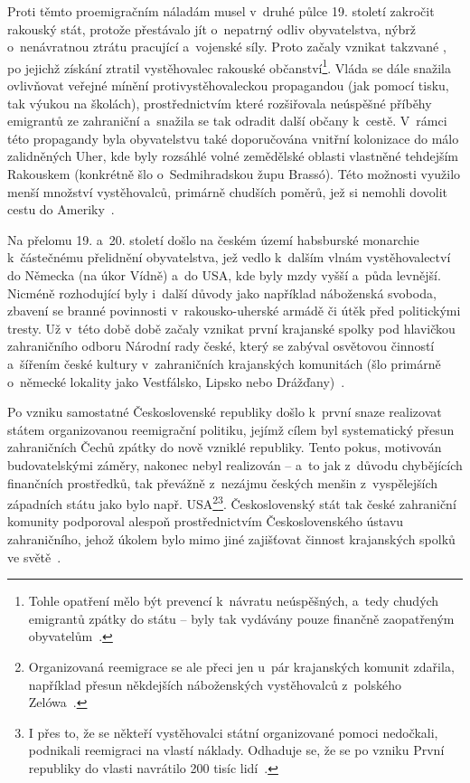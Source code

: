 Proti těmto proemigračním náladám musel v~druhé půlce 19. století zakročit rakouský stát, protože přestávalo jít o~nepatrný odliv obyvatelstva, nýbrž o~nenávratnou ztrátu pracující a~vojenské síly. Proto začaly vznikat takzvané , po jejichž získání ztratil vystěhovalec rakouské občanství\footnote{Tohle opatření mělo být prevencí k~návratu neúspěšných, a~tedy chudých emigrantů zpátky do státu – byly tak vydávány pouze finančně zaopatřeným obyvatelům~\parencite{Vaculik2002}.}. Vláda se dále snažila ovlivňovat veřejné mínění protivystěhovaleckou propagandou (jak pomocí tisku, tak výukou na školách), prostřednictvím které rozšiřovala neúspěšné příběhy emigrantů ze zahraniční a~snažila se tak odradit další občany k~cestě. V~rámci této propagandy byla obyvatelstvu také doporučována vnitřní kolonizace do málo zalidněných Uher, kde byly rozsáhlé volné zemědělské oblasti vlastněné tehdejším Rakouskem (konkrétně šlo o~Sedmihradskou župu Brassó). Této možnosti využilo menší množství vystěhovalců, primárně chudších poměrů, jež si nemohli dovolit cestu do Ameriky~\parencite{Vaculik2009b}.

Na přelomu 19. a~20. století došlo na českém území habsburské monarchie k~částečnému přelidnění obyvatelstva, jež vedlo k~dalším vlnám vystěhovalectví do Německa (na úkor Vídně) a~do USA, kde byly mzdy vyšší a~půda levnější. Nicméně rozhodující byly i~další důvody jako například náboženská svoboda, zbavení se branné povinnosti v~rakousko-uherské armádě či útěk před politickými tresty. Už v~této době době začaly vznikat první krajanské spolky pod hlavičkou zahraničního odboru Národní rady české, který se zabýval osvětovou činností a~šířením české kultury v~zahraničních krajanských komunitách (šlo primárně o~německé lokality jako Vestfálsko, Lipsko nebo Drážďany)~\parencite{Vaculik2009b}.

Po vzniku samostatné Československé republiky došlo k~první snaze realizovat státem organizovanou reemigrační politiku, jejímž cílem byl systematický přesun zahraničních Čechů zpátky do nově vzniklé republiky. Tento pokus, motivován budovatelskými záměry, nakonec nebyl realizován -- a~to jak z~důvodu chybějících finančních prostředků, tak převážně z~nezájmu českých menšin z~vyspělejších západních státu jako bylo např. USA\footnote{Organizovaná reemigrace se ale přeci jen u~pár krajanských komunit zdařila, například přesun někdejších náboženských vystěhovalců z~polského Zelówa~\parencite{Nespor2005}.}\footnote{I přes to, že se někteří vystěhovalci státní organizované pomoci nedočkali, podnikali reemigraci na vlastí náklady. Odhaduje se, že se po vzniku První republiky do vlasti navrátilo 200 tisíc lidí~\parencite{Vaculik2009b}.}. Československý stát tak české zahraniční komunity podporoval alespoň prostřednictvím Československého ústavu zahraničního, jehož úkolem bylo mimo jiné zajišťovat činnost krajanských spolků ve světě~\parencite{Nespor2005}.

